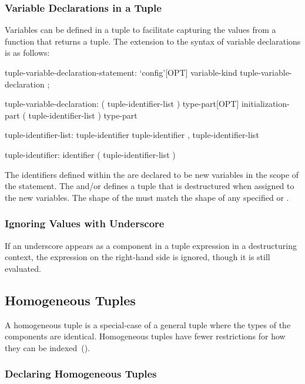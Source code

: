\subsubsection{Variable Declarations in a Tuple}
\label{Variable_Declarations_in_a_Tuple}

Variables can be defined in a tuple to facilitate capturing the values
from a function that returns a tuple.  The extension to the syntax of
variable declarations is as follows:
\begin{syntax}
tuple-variable-declaration-statement:
  `config'[OPT] variable-kind tuple-variable-declaration ;

tuple-variable-declaration:
  ( tuple-identifier-list ) type-part[OPT] initialization-part
  ( tuple-identifier-list ) type-part

tuple-identifier-list:
  tuple-identifier
  tuple-identifier , tuple-identifier-list

tuple-identifier:
  identifier
  ( tuple-identifier-list )
\end{syntax}
The identifiers defined within the  are declared
to be new variables in the scope of the statement.  The
 and/or  defines a tuple
that is destructured when assigned to the new variables. The shape of the
 must match the shape of any specified
 or .

\subsubsection{Ignoring Values with Underscore}
\label{Ignoring_Values_with_Underscore}

If an underscore appears as a component in a tuple expression in a
destructuring context, the expression on the right-hand side is
ignored, though it is still evaluated.

\subsection{Homogeneous Tuples}
\label{Homogeneous_Tuples}

A homogeneous tuple is a special-case of a general tuple where the
types of the components are identical.  Homogeneous tuples have fewer
restrictions for how they can be indexed~().

\subsubsection{Declaring Homogeneous Tuples}
\label{Declaring_Homogeneous_Tuples}

